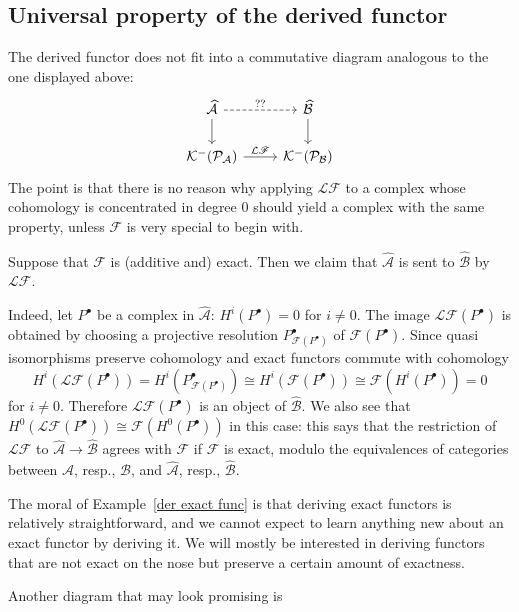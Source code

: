 \subsection{Universal property of the derived functor}
The derived functor does not fit into a commutative diagram analogous to the one displayed above:
\[\begin{tikzcd}
\widehat{\mathcal{A}}\ar[d]\ar[r,dashed,"??"]&\widehat{\mathcal{B}}\ar[d]\\
\mathcal{K}^-(\mathcal{P}_{\mathcal{A}})\ar[r,"\mathcal{L}\mathscr{F}"]&\mathcal{K}^-(\mathcal{P}_{\mathcal{B}})
\end{tikzcd}\]
The point is that there is no reason why applying $\mathcal{L}\mathscr{F}$ to a complex whose cohomology is concentrated in degree $0$ should yield a complex with the same property, unless $\mathscr{F}$ is very special to begin with.
\begin{example}\label{der exact func}
Suppose that $\mathscr{F}$ is (additive and) exact. Then we claim that $\widehat{\mathcal{A}}$ is
sent to $\widehat{\mathcal{B}}$ by $\mathcal{L}\mathscr{F}$.\par
Indeed, let $P^\bullet$ be a complex in $\widehat{\mathcal{A}}$: $H^i(P^\bullet)=0$ for $i\neq0$. The image $\mathcal{L}\mathscr{F}(P^\bullet)$ is obtained by choosing a projective resolution $P^\bullet_{\mathscr{F}(P^\bullet)}$ of $\mathscr{F}(P^\bullet)$. Since quasi isomorphisms
preserve cohomology and exact functors commute with cohomology
\[H^i(\mathcal{L}\mathscr{F}(P^\bullet))=H^i(P^\bullet_{\mathscr{F}(P^\bullet)})\cong H^i(\mathscr{F}(P^\bullet))\cong\mathscr{F}(H^i(P^\bullet))=0\]
for $i\neq0$. Therefore $\mathcal{L}\mathscr{F}(P^\bullet)$ is an object of $\widehat{\mathcal{B}}$.
We also see that $H^0(\mathcal{L}\mathscr{F}(P^\bullet))\cong\mathscr{F}(H^0(P^\bullet))$ in this case: this says that the restriction of $\mathcal{L}\mathscr{F}$ to $\widehat{\mathcal{A}}\to\widehat{\mathcal{B}}$ agrees with $\mathscr{F}$ if $\mathscr{F}$ is exact, modulo the equivalences of categories between $\mathcal{A}$, resp., $\mathcal{B}$, and $\widehat{\mathcal{A}}$, resp., $\widehat{\mathcal{B}}$.
\end{example}
The moral of Example~\ref{der exact func} is that deriving exact functors is relatively straightforward, and we cannot expect to learn anything new about an exact functor by deriving it. We will mostly be interested in deriving functors that are not exact on the nose but preserve a certain amount of exactness.\par
Another diagram that may look promising is
